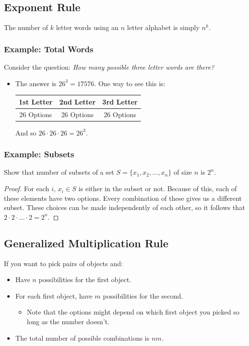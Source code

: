\documentclass[letterpaper]{article}
\begin{document}
\subsection{Exponent Rule}
The number of $k$ letter words using an $n$ letter alphabet is simply $n^k$. 

\subsubsection{Example: Total Words}
Consider the question: \emph{How many possible three letter words are there?} 

\begin{itemize}
    \item The answer is $26^3 = 17576$. One way to see this is:
    \begin{center}
        \begin{tabular}{c|c|c}
            1st Letter & 2nd Letter & 3rd Letter \\ 
            \hline 
            26 Options & 26 Options & 26 Options
        \end{tabular}
    \end{center}
    And so $26 \cdot 26 \cdot 26 = 26^3$.
\end{itemize}

\subsubsection{Example: Subsets}
Show that number of subsets of a set $S = \{x_1, x_2, ..., x_n\}$ of size $n$ is $2^n$. 

\begin{proof}
    For each $i$, $x_i \in S$ is either in the subset or not. Because of this, each of these elements have two options. Every combination of these gives us a different subset. These choices can be made independently of each other, so it follows that $2 \cdot 2 \cdot ... \cdot 2 = 2^n$. 
\end{proof}

\subsection{Generalized Multiplication Rule}
If you want to pick pairs of objects and:
\begin{itemize}
    \item Have $n$ possibilities for the first object.
    \item For each first object, have $m$ possibilities for the second. 
    \begin{itemize}
        \item Note that the options might depend on which first object you picked so long as the number doesn't. 
    \end{itemize}

    \item The total number of possible combinations is $nm$.  
\end{itemize}
\end{document}
